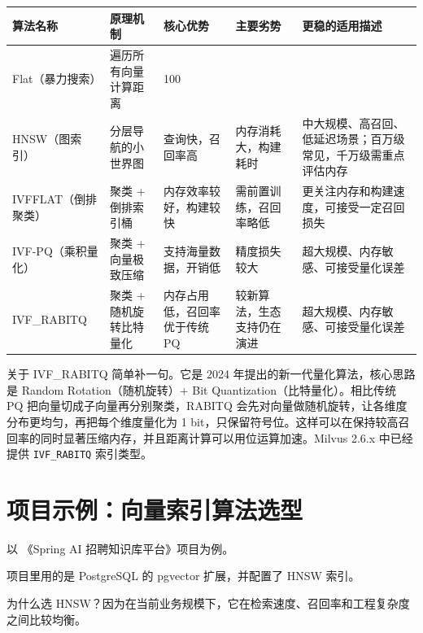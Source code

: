 \documentclass[9pt,a4paper,twocolumn]{ctexart}
\begin{document}
{\footnotesize
\begin{tabular}{|p{}|p{}|p{}|p{}|p{}|}
\hline
\textbf{算法名称} & \textbf{原理机制} & \textbf{核心优势} & \textbf{主要劣势} & \textbf{更稳的适用描述} \\
\hline
Flat（暴力搜索） & 遍历所有向量计算距离 & 100\\%
\hline
HNSW（图索引） & 分层导航的小世界图 & 查询快，召回率高 & 内存消耗大，构建耗时 & 中大规模、高召回、低延迟场景；百万级常见，千万级需重点评估内存 \\
\hline
IVFFLAT（倒排聚类） & 聚类 + 倒排索引桶 & 内存效率较好，构建较快 & 需前置训练，召回率略低 & 更关注内存和构建速度，可接受一定召回损失 \\
\hline
IVF-PQ（乘积量化） & 聚类 + 向量极致压缩 & 支持海量数据，开销低 & 精度损失较大 & 超大规模、内存敏感、可接受量化误差 \\
\hline
IVF\_RABITQ & 聚类 + 随机旋转比特量化 & 内存占用低，召回率优于传统 PQ & 较新算法，生态支持仍在演进 & 超大规模、内存敏感、可接受量化误差 \\
\hline
\end{tabular}
}



关于 IVF\_RABITQ 简单补一句。它是 2024 年提出的新一代量化算法，核心思路是 Random Rotation（随机旋转）+ Bit Quantization（比特量化）。相比传统 PQ 把向量切成子向量再分别聚类，RABITQ 会先对向量做随机旋转，让各维度分布更均匀，再把每个维度量化为 1 bit，只保留符号位。这样可以在保持较高召回率的同时显著压缩内存，并且距离计算可以用位运算加速。Milvus 2.6.x 中已经提供 \texttt{IVF\_RABITQ} 索引类型。



\section*{项目示例：向量索引算法选型}


以 《Spring AI 招聘知识库平台》项目为例。



项目里用的是 PostgreSQL 的 pgvector 扩展，并配置了 HNSW 索引。



为什么选 HNSW？因为在当前业务规模下，它在检索速度、召回率和工程复杂度之间比较均衡。
\end{document}
